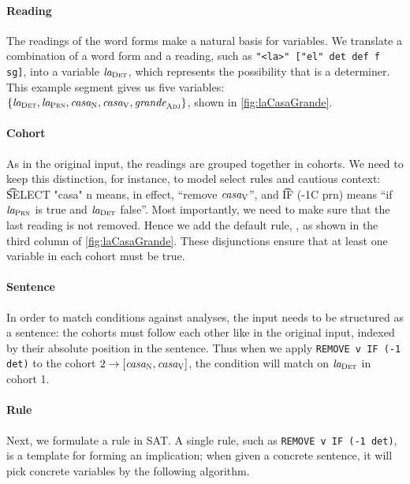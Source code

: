 \paragraph{Reading}
The readings of the word forms make a natural basis for variables.
We translate a combination of a word form and a reading, such as \texttt{"<la>" ["el" det def f sg]}, into a variable $\text{\em la}_{\text{\sc Det}}$, which represents the possibility that \la{} is a determiner. This example segment gives us five variables: $\{ \text{\em la}_{\text{\sc Det}} , \text{\em la}_{\text{\sc Prn}} , \text{\em casa}_{\text{\sc N}} , \text{\em casa}_{\text{\sc V}},  \text{\em grande}_{\text{\sc Adj}} \}$, shown in \ref{fig:laCasaGrande}.

\paragraph{Cohort} As in the original input, the readings are grouped together in cohorts. We need to keep this distinction, for instance, to model {\sc select} rules and cautious context: 
\t{SELECT "casa" n} means, in effect, ``remove $\text{\em casa}_{\text{\sc V}}$'', and \t{IF (-1C prn)} means ``if $\text{\em la}_{\text{\sc Prn}}$ is true and $\text{\em la}_{\text{\sc Det}}$ false''. 
%
Most importantly, we need to make sure that the last reading is not removed. Hence we add the default rule, , as shown in the third column of \ref{fig:laCasaGrande}. 
These disjunctions ensure that at least one variable in each cohort must be true.



\paragraph{Sentence}
In order to match conditions against analyses, the input needs to be structured as a sentence: the cohorts must follow each other like in the original input, indexed by their absolute position in the sentence. Thus when we apply \texttt{REMOVE v IF (-1 det)} to the cohort $2 \rightarrow [\text{\em casa}_{\text{\sc N}} , \text{\em casa}_{\text{\sc V}}]$, the condition will match on $\text{\em la}_{\text{\sc Det}}$ in cohort 1.


\paragraph{Rule}

Next, we formulate a rule in SAT. A single rule, such as \texttt{REMOVE v IF (-1 det)}, is a template for forming an implication; when given a concrete sentence, it will pick concrete variables by the following algorithm.

